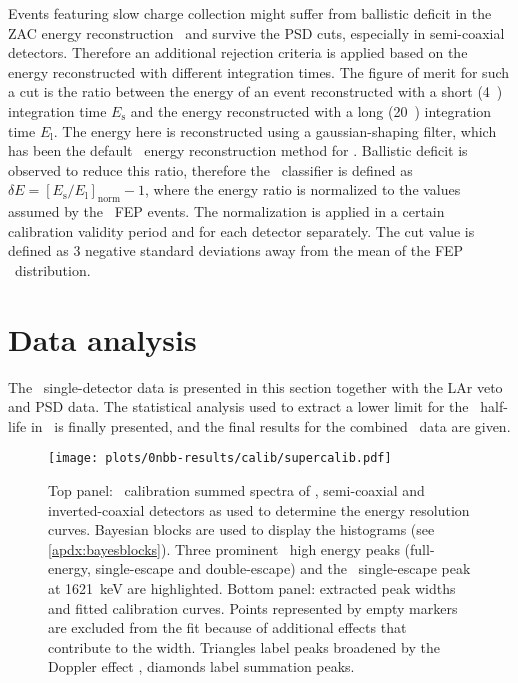 Events featuring slow charge collection might suffer from ballistic deficit in the ZAC
energy reconstruction~\cite{Agostini2015} and survive the PSD cuts, especially in
semi-coaxial detectors. Therefore an additional rejection criteria is applied based on the
energy reconstructed with different integration times. The figure of merit for such a cut
is the ratio between the energy of an event reconstructed with a short (4~\mus)
integration time $E_\text{s}$ and the energy reconstructed with a long (20~\mus)
integration time $E_\text{l}$. The energy here is reconstructed using a gaussian-shaping
filter, which has been the default \gerda\ energy reconstruction method for \phaseone.
Ballistic deficit is observed to reduce this ratio, therefore the \deltae\ classifier is
defined as $\delta{E} = {[E_\text{s}/E_\text{l}]}_\text{norm} - 1$, where the energy ratio
is normalized to the values assumed by the \Th\ FEP events. The normalization is applied
in a certain calibration validity period and for each detector separately. The cut value
is defined as 3 negative standard deviations away from the mean of the FEP \deltae\
distribution.

\section{Data analysis}%
\label{sec:gerda:ana}

The \phasetwo\ single-detector data is presented in this section together with the LAr
veto and PSD data.  The statistical analysis used to extract a lower limit for the \onbb\
half-life in \gesix\ is finally presented, and the final results for the combined \gerda\
data are given.

\begin{figure}
  \centering
  \texttt{[image: plots/0nbb-results/calib/supercalib.pdf]}
  \caption{%
    Top panel: \Th\ calibration summed spectra of \bege, semi-coaxial and inverted-coaxial
    detectors as used to determine the energy resolution curves. Bayesian blocks are used
    to display the histograms (see \cref{apdx:bayesblocks}). Three prominent \Tl\ high
    energy peaks (full-energy, single-escape and double-escape) and the \Bil\
    single-escape peak at 1621~keV are highlighted. Bottom panel: extracted peak widths
    and fitted calibration curves. Points represented by empty markers are excluded from
    the fit because of additional effects that contribute to the width. Triangles label
    peaks broadened by the Doppler effect \fillme{ref?}, diamonds label summation peaks.
    \fillme{fillme}
  }\label{fig:gerda:calib-desc}
\end{figure}

